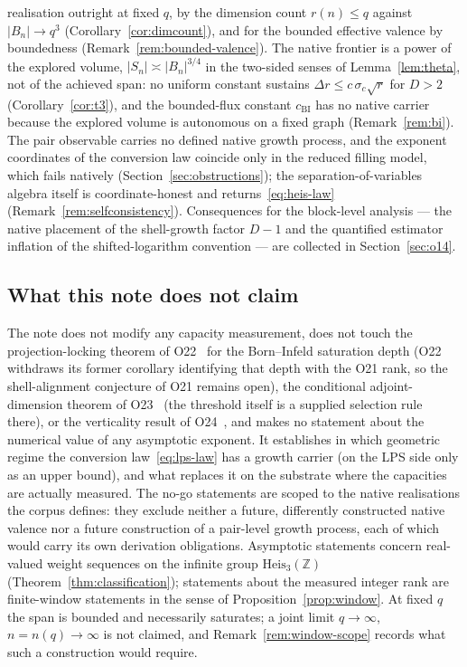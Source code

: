 \documentclass[11pt,a4paper]{article}
\theoremstyle{definition}
\newcommand{\Heis}{\mathrm{Heis}_3(\mathbb{Z})}
\newcommand{\cBI}{c_{\mathrm{BI}}}
\begin{document}
realisation outright at fixed $q$, by the dimension count $r(n) \le q$ against $|B_n| \to q^3$
(Corollary~\ref{cor:dimcount}), and for the bounded effective valence by boundedness
(Remark~\ref{rem:bounded-valence}).
The native frontier is a power of the explored volume, $|S_n| \asymp |B_n|^{3/4}$ in the two-sided senses
of Lemma~\ref{lem:theta}, not of the achieved span: no uniform constant sustains
$\Delta r \le c\,\sigma_c\sqrt{r}$ for $D > 2$ (Corollary~\ref{cor:t3}), and the bounded-flux constant
$\cBI$ has no native carrier because the explored volume is autonomous on a fixed graph
(Remark~\ref{rem:bi}).
The pair observable carries no defined native growth process, and the exponent coordinates of the
conversion law coincide only in the reduced filling model, which fails natively
(Section~\ref{sec:obstructions}); the separation-of-variables algebra itself is coordinate-honest and
returns~\eqref{eq:heis-law} (Remark~\ref{rem:selfconsistency}).
Consequences for the block-level analysis --- the native placement of the shell-growth factor $D - 1$ and
the quantified estimator inflation of the shifted-logarithm convention --- are collected in
Section~\ref{sec:o14}.

\subsection{What this note does not claim}
\label{ssec:scope}

The note does not modify any capacity measurement, does not touch the projection-locking theorem of
O22~\cite{Beau2026a26} for the Born--Infeld saturation depth (O22 withdraws its former corollary
identifying that depth with the O21 rank, so the shell-alignment conjecture of O21 remains open), the
conditional adjoint-dimension theorem of O23~\cite{Beau2026a27}
(the threshold itself is a supplied selection rule there), or the verticality result of
O24~\cite{Beau2026a28}, and makes no statement about the numerical value of any asymptotic exponent.
It establishes in which geometric regime the conversion law~\eqref{eq:lps-law} has a growth carrier (on the
LPS side only as an upper bound), and what
replaces it on the substrate where the capacities are actually measured.
The no-go statements are scoped to the native realisations the corpus defines: they exclude neither a
future, differently constructed native valence nor a future construction of a pair-level growth process,
each of which would carry its own derivation obligations.
Asymptotic statements concern real-valued weight sequences on the infinite group $\Heis$
(Theorem~\ref{thm:classification}); statements about the measured integer rank are finite-window statements
in the sense of Proposition~\ref{prop:window}.
At fixed $q$ the span is bounded and necessarily saturates; a joint limit $q \to \infty$, $n = n(q) \to
\infty$ is not claimed, and Remark~\ref{rem:window-scope} records what such a construction would require.
\end{document}

